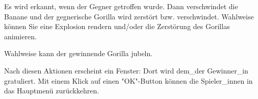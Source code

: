 Es wird erkannt, wenn der Gegner getroffen wurde. Dann verschwindet die Banane und der gegnerische Gorilla wird zerstört bzw. verschwindet. Wahlweise können Sie eine Explosion rendern und/oder die Zerstörung des Gorillas animieren.

Wahlweise kann der gewinnende Gorilla jubeln.

Nach diesen Aktionen erscheint ein Fenster: Dort wird dem\_der Gewinner\_in gratuliert. Mit einem Klick auf einen "OK"-Button können die Spieler\_innen in das Hauptmenü zurückkehren.